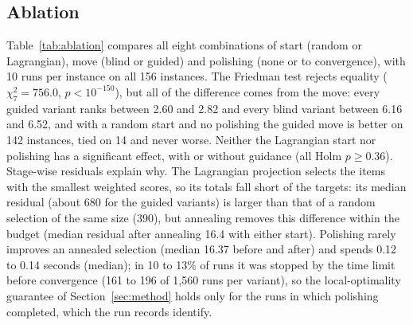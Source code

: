 \documentclass[pdflatex,sn-mathphys-num]{sn-jnl}
\theoremstyle{thmstyleone}
\theoremstyle{thmstylethree}
\begin{document}
\subsection{Ablation}
Table~\ref{tab:ablation} compares all eight combinations of start (random or Lagrangian), move (blind or guided) and polishing (none or to convergence), with 10 runs per instance on all 156 instances. The Friedman test rejects equality ($\chi^2_7=756.0$, $p<10^{-150}$), but all of the difference comes from the move: every guided variant ranks between 2.60 and 2.82 and every blind variant between 6.16 and 6.52, and with a random start and no polishing the guided move is better on 142 instances, tied on 14 and never worse. Neither the Lagrangian start nor polishing has a significant effect, with or without guidance (all Holm $p\ge0.36$). Stage-wise residuals explain why. The Lagrangian projection selects the items with the smallest weighted scores, so its totals fall short of the targets: its median residual (about 680 for the guided variants) is larger than that of a random selection of the same size (390), but annealing removes this difference within the budget (median residual after annealing 16.4 with either start). Polishing rarely improves an annealed selection (median 16.37 before and after) and spends 0.12 to 0.14 seconds (median); in 10 to 13\% of runs it was stopped by the time limit before convergence (161 to 196 of 1{,}560 runs per variant), so the local-optimality guarantee of Section~\ref{sec:method} holds only for the runs in which polishing completed, which the run records identify.


\end{document}
